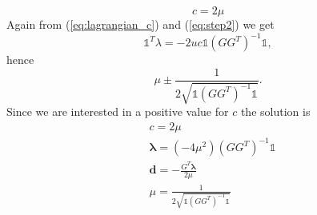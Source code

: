 \documentclass{article}
\renewcommand{\vec}[1]{\boldsymbol{#1}}
\newcommand{\onevec}{\mathds{1}}
\begin{document}
\begin{equation}
	c = 2\mu
\end{equation}
Again from (\ref{eq:lagrangian_c}) and (\ref{eq:step2}) we get
\begin{equation}
	\onevec^T\lambda = -2uc \onevec(GG^T)^{-1}\onevec,
\end{equation} hence 
\begin{equation}
	\mu \pm \frac{1}{2\sqrt{\onevec(GG^T)^{-1}\onevec}}.
\end{equation}
Since we are interested in a positive value for $c$ the solution is
\begin{align}
	& c = 2\mu\\
	&\vec{\lambda} = (-4\mu^2)(GG^T)^{-1} \onevec\\
	&\vec{d} = -\frac{G^T\vec{\lambda}}{2\mu}\\
	&\mu = \frac{1}{2\sqrt{\onevec(GG^T)^{-1}\onevec}}
\end{align}
\end{document}
